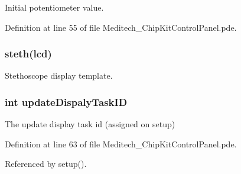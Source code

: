 Initial potentiometer value. 



Definition at line 55 of file Meditech\-\_\-\-Chip\-Kit\-Control\-Panel.\-pde.

\hypertarget{_meditech___chip_kit_control_panel_8pde_ac2215fe61cf27d0fc83fa54cf1db73fc}{
\subsubsection[{steth}]{ steth({\bf lcd})}}\label{_meditech___chip_kit_control_panel_8pde_ac2215fe61cf27d0fc83fa54cf1db73fc}


Stethoscope display template. 

\hypertarget{_meditech___chip_kit_control_panel_8pde_a527a89c41abb1d8660b53f5e727e655c}{
\subsubsection[{update\-Dispaly\-Task\-I\-D}]{\setlength{\rightskip}{0pt plus 5cm}int update\-Dispaly\-Task\-I\-D}}\label{_meditech___chip_kit_control_panel_8pde_a527a89c41abb1d8660b53f5e727e655c}


The update display task id (assigned on setup) 



Definition at line 63 of file Meditech\-\_\-\-Chip\-Kit\-Control\-Panel.\-pde.



Referenced by setup().

